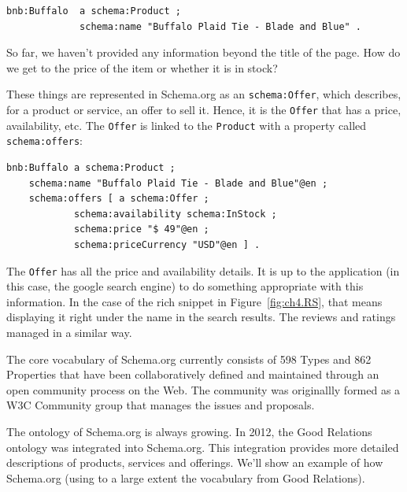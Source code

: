 \begin{lstlisting}
bnb:Buffalo  a schema:Product ;
             schema:name "Buffalo Plaid Tie - Blade and Blue" .
\end{lstlisting}

So far, we haven't provided any information beyond the title of the page.  How do we get
to the price of the item or whether it is in stock? 

These things are represented in Schema.org as an \texttt{schema:Offer}, which describes, 
for a product or service, an offer to sell it.  Hence, it is the \texttt{Offer} that has
a price, availability, etc.  The \texttt{Offer} is linked to the \texttt{Product} with a 
property called \texttt{schema:offers}:

\begin{lstlisting}
bnb:Buffalo a schema:Product ;
    schema:name "Buffalo Plaid Tie - Blade and Blue"@en ;
    schema:offers [ a schema:Offer ;
            schema:availability schema:InStock ;
            schema:price "$ 49"@en ;
            schema:priceCurrency "USD"@en ] .
\end{lstlisting}

The \texttt{Offer} has all the price and availability details.  It is up to the 
application (in this case, the google search engine) to do something appropriate
with this information.  In the case of the rich snippet in Figure~\ref{fig:ch4.RS}, that
means displaying it right under the name in the search results.  The reviews and ratings 
managed in a similar way. 

The core vocabulary of Schema.org currently consists of 598 Types and 862 Properties that 
have been collaboratively defined and maintained through an open community process on the 
Web.  The community was originallly formed as a W3C Community group that manages the 
issues 
and proposals. 

The ontology of Schema.org is always growing.  In 2012, the Good Relations ontology
was integrated into Schema.org.  This integration provides more detailed descriptions of 
products, services and offerings.  We'll show an example of how Schema.org 
(using to a large extent the vocabulary from Good Relations).

